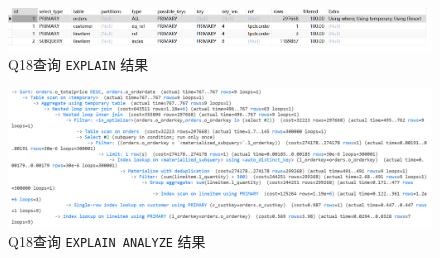 \documentclass{article}
\renewcommand\tt{\texttt}
\begin{document}
\begin{enumerate}
\begin{figure}[H]
\centering
\includegraphics[width=1\textwidth]{img/35.png}
\caption{Q18查询 \tt{EXPLAIN} 结果}
\end{figure}

\begin{figure}[H]
\centering
\includegraphics[width=1\textwidth]{img/36.png}
\caption{Q18查询 \tt{EXPLAIN ANALYZE} 结果}
\end{figure}


\end{enumerate}
\end{document}
